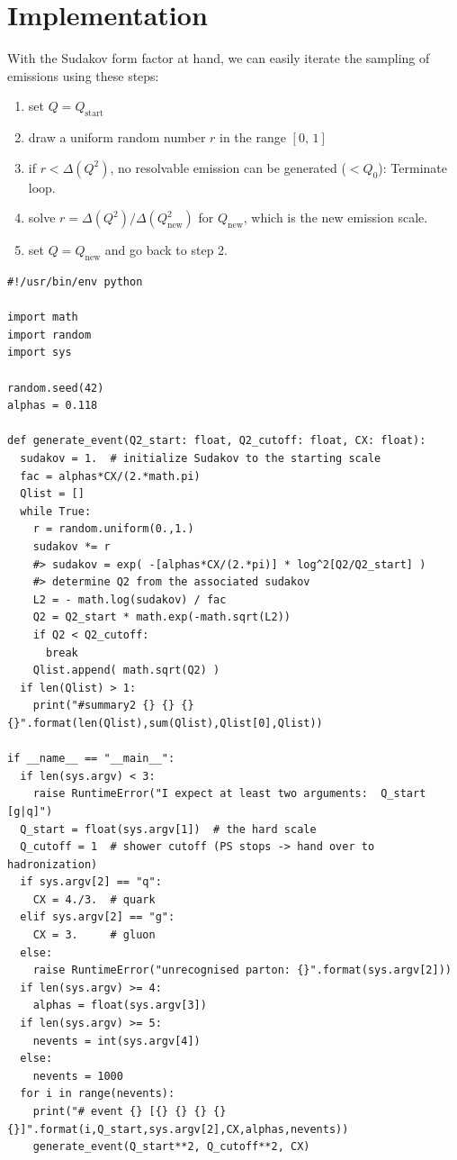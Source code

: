 \documentclass[11pt]{article}
\begin{document}
\section{Implementation}
\label{sec:org61bbcbf}

With the Sudakov form factor at hand, we can easily iterate the sampling of emissions using these steps:
\begin{enumerate}
\item set \(Q = Q_\mathrm{start}\)
\item draw a uniform random number \(r\) in the range \([0,\,1]\)
\item if \(r<\Delta(Q^2)\), no resolvable emission can be generated (\(<Q_0\)):
Terminate loop.
\item solve \(r = \Delta(Q^2) / \Delta(Q_\mathrm{new}^2)\) for \(Q_\mathrm{new}\), which is the new emission scale.
\item set \(Q = Q_\mathrm{new}\) and go back to step 2.
\end{enumerate}

\begin{verbatim}
#!/usr/bin/env python

import math
import random
import sys

random.seed(42)
alphas = 0.118

def generate_event(Q2_start: float, Q2_cutoff: float, CX: float):
  sudakov = 1.  # initialize Sudakov to the starting scale
  fac = alphas*CX/(2.*math.pi)
  Qlist = []
  while True:
    r = random.uniform(0.,1.)
    sudakov *= r
    #> sudakov = exp( -[alphas*CX/(2.*pi)] * log^2[Q2/Q2_start] )
    #> determine Q2 from the associated sudakov
    L2 = - math.log(sudakov) / fac
    Q2 = Q2_start * math.exp(-math.sqrt(L2))
    if Q2 < Q2_cutoff:
      break
    Qlist.append( math.sqrt(Q2) )
  if len(Qlist) > 1:
    print("#summary2 {} {} {} {}".format(len(Qlist),sum(Qlist),Qlist[0],Qlist))

if __name__ == "__main__":
  if len(sys.argv) < 3:
    raise RuntimeError("I expect at least two arguments:  Q_start [g|q]")
  Q_start = float(sys.argv[1])  # the hard scale
  Q_cutoff = 1  # shower cutoff (PS stops -> hand over to hadronization)
  if sys.argv[2] == "q":
    CX = 4./3.  # quark
  elif sys.argv[2] == "g":
    CX = 3.     # gluon
  else:
    raise RuntimeError("unrecognised parton: {}".format(sys.argv[2]))
  if len(sys.argv) >= 4:
    alphas = float(sys.argv[3])
  if len(sys.argv) >= 5:
    nevents = int(sys.argv[4])
  else:
    nevents = 1000
  for i in range(nevents):
    print("# event {} [{} {} {} {} {}]".format(i,Q_start,sys.argv[2],CX,alphas,nevents))
    generate_event(Q_start**2, Q_cutoff**2, CX)
\end{verbatim}
\end{document}
